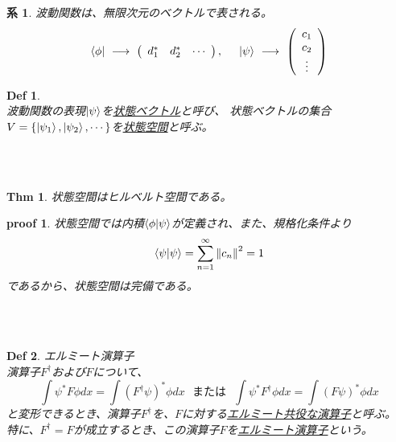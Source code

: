 \documentclass{jsarticle}
\newtheorem{df}{Def}[section]
\newtheorem{thm}{Thm}[section]
\newtheorem{co}{系}[section]
\newtheorem{pf}{proof}[section]
\newcommand{\norm}[1]{\left\lVert#1\right\rVert}
\begin{document}
\begin{co} 波動関数は、無限次元のベクトルで表される。
    \begin{equation}
        \bra{\phi}~\longrightarrow~
        \left(
        \begin{array}{ccc}
            d_{1}^{*} & d_{2}^{*} & \cdots
        \end{array}
        \right),
        \hspace{5mm}
        \ket{\psi}~\longrightarrow~
        \left(
        \begin{array}{c}
            c_{1} \\
            c_{2} \\
            \vdots
        \end{array}
        \right)
    \end{equation}
\end{co}

\begin{df}~\\
    波動関数の表現\(\ket{\psi}\)を\underline{状態ベクトル}と呼び、
    状態ベクトルの集合\(V=\{\ket{\psi_{1}},\ket{\psi_{2}},\cdots\}\)を\underline{状態空間}と呼ぶ。
\end{df}

~\\~
\begin{thm}状態空間はヒルベルト空間である。
\end{thm}
\begin{pf}
    状態空間では内積\(\braket{\phi|\psi}\)が定義され、また、規格化条件より
    \begin{equation}
        \braket{\psi|\psi}=\sum_{n=1}^{\infty}\norm{c_{n}}^{2}=1
    \end{equation}
    であるから、状態空間は完備である。
\end{pf}

~\\~
\begin{df}エルミート演算子\\
    演算子\(F^{\dagger}\)および\(F\)について、
    \begin{equation}
        \int\psi^{*}F\phi dx = \int(F^{\dagger}\psi)^{*}\phi dx~~~または~~~
        \int\psi^{*}F^{\dagger}\phi dx = \int(F\psi)^{*}\phi dx
    \end{equation}
    と変形できるとき、演算子\(F^{\dagger}\)を、\(F\)に対する\underline{エルミート共役な演算子}と呼ぶ。\\
    特に、\(F^{\dagger}=F\)が成立するとき、この演算子\(F\)を\underline{エルミート演算子}という。
\end{df}
\end{document}
